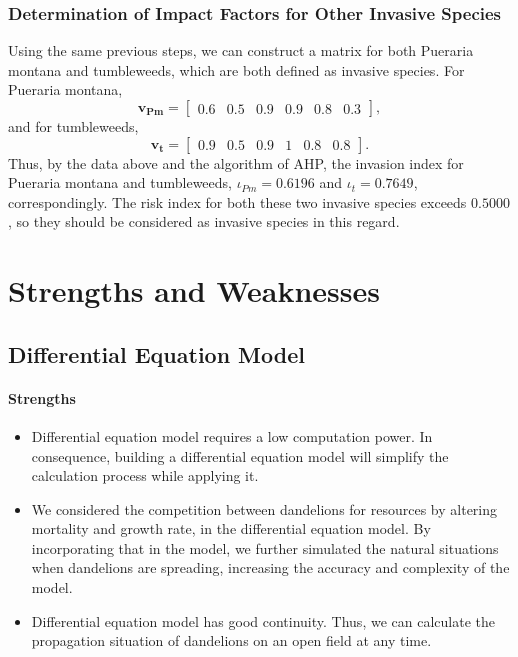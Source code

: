 \documentclass[12pt]{article}
\begin{document}
\subsubsection{Determination of Impact Factors for Other Invasive Species}
Using the same previous steps, we can construct a matrix for both Pueraria montana and tumbleweeds, which are both defined as invasive species. For Pueraria montana,
\begin{equation}
\mathrm {\mathbf{v_{Pm}}}=
\begin{bmatrix}

0.6 &0.5 &0.9&0.9&0.8&0.3
 \end{bmatrix},
\end{equation}
and for tumbleweeds,
\begin{equation}
\mathrm {\mathbf{v_{t}}}=
\begin{bmatrix}
0.9&0.5 &0.9&1&0.8 &0.8
 \end{bmatrix}.
\end{equation}
Thus, by the data above and the algorithm of AHP, the invasion index for Pueraria montana and tumbleweeds, $\iota_{Pm}=0.6196$ and $\iota_{t}=0.7649$, correspondingly. The risk index for both these two invasive species exceeds $0.5000$, so they should be considered as invasive species in this regard.

\section{Strengths and Weaknesses}
\subsection{Differential Equation Model}
\paragraph{Strengths}
\begin{itemize}
\item Differential equation model requires a low computation power. In consequence, building a differential equation model will simplify the calculation process while applying it. 
\item We considered the competition between dandelions for resources by altering mortality and growth rate, in the differential equation model. By incorporating that in the model, we further simulated the natural situations when dandelions are spreading, increasing the accuracy and complexity of the model. 
\item Differential equation model has good continuity. Thus, we can calculate the propagation situation of dandelions on an open field at any time. 
\end{itemize}
\end{document}
